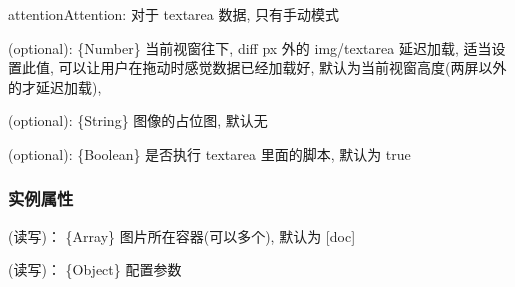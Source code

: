 \documentclass[letterpaper,10pt,english]{sphinxmanual}
\begin{document}
\begin{notice}{attention}{Attention:}
对于 textarea 数据, 只有手动模式
\end{notice}


\begin{fulllineitems}
\label{api/component/datalazyload/index:DataLazyload.diff}
(optional):  \{Number\} 当前视窗往下, diff px 外的 img/textarea 延迟加载, 适当设置此值, 可以让用户在拖动时感觉数据已经加载好, 默认为当前视窗高度(两屏以外的才延迟加载),

\end{fulllineitems}



\begin{fulllineitems}
\label{api/component/datalazyload/index:DataLazyload.placeholder}
(optional): \{String\} 图像的占位图, 默认无

\end{fulllineitems}



\begin{fulllineitems}
\label{api/component/datalazyload/index:DataLazyload.execScript}
(optional): \{Boolean\} 是否执行 textarea 里面的脚本, 默认为 true

\end{fulllineitems}



\subsubsection{实例属性}
\label{api/component/datalazyload/index:id3}

\begin{fulllineitems}
\label{api/component/datalazyload/index:DataLazyload.containers}
(读写)： \{Array\} 图片所在容器(可以多个), 默认为 {[}doc{]}

\end{fulllineitems}



\begin{fulllineitems}
\label{api/component/datalazyload/index:DataLazyload.config}
(读写)： \{Object\} 配置参数

\end{fulllineitems}
\end{document}
